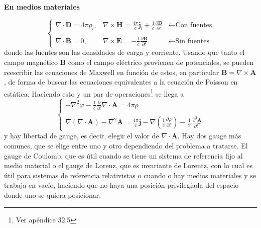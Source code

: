 \begin{center}
\textbf{En medios materiales}
\end{center}
\begin{equation*}
    \left\{
        \begin{matrix}
            \nabla \cdot \textbf{D} = 4\pi\rho_{l},
            &
            \nabla \times \textbf{H} = 
            \frac{4\pi}{c}\textbf{j}_{l}
            + \frac{1}{c}\frac{\partial \textbf{D}}{\partial t}
            &
            \longleftarrow
            \mbox{Con fuentes}\\
            & & \\
            \nabla \cdot \textbf{B} = 0,
            &
            \nabla \times \textbf{E} =
            -\frac{1}{c}\frac{\partial \textbf{B}}{\partial t}
            &
            \longleftarrow \mbox{Sin fuentes}
        \end{matrix}
    \right.
\end{equation*}
donde las fuentes son las densidades de carga y corriente. Usando que tanto el campo magnético $\textbf{B}$ como el campo eléctrico provienen de potenciales, se pueden reescribir las ecuaciones de Maxwell en función de estos, en particular $\textbf{B} = \nabla \times \textbf{A}$, de forma de buscar las ecuaciones equivalentes a la ecuación de Poisson en estática. Haciendo esto y un par de operaciones\footnote{Ver apéndice 32.5 } se llega a
\begin{equation*}
    \left\{
        \begin{matrix}
            -\nabla^{2}\varphi - \frac{1}{c}\frac{\partial}{\partial t}
            \nabla \cdot \textbf{A}
            = 4\pi\rho\\
            \\
            \nabla (\nabla \cdot \textbf{A})
            - \nabla^{2}\textbf{A} = \frac{4\pi}{c}\textbf{j}
            - \nabla 
            \left(
                \frac{1}{c}\frac{\partial \varphi}{\partial t}
            \right)
            -\frac{1}{c^{2}}\frac{\partial^{2}\textbf{A}}{\partial t^{2}}
        \end{matrix}
    \right.
        \label{ec:MaxwellyPotencialesenTiempo}
\end{equation*}
y hay libertad de gauge, es decir, elegir el valor de $\nabla \cdot \textbf{A}$. Hay dos gauge más comunes, que se elige entre uno y otro dependiendo del problema a tratarse. El gauge de Coulomb, que es útil cuando se tiene un sistema de referencia fijo al medio material o el gauge de Lorenz, que es invariante de Lorentz, con lo cual es útil para sistemas de referencia relativistas o cuando o hay medios materiales y se trabaja en vacío, haciendo que no haya una posición privilegiada del espacio donde uno se quiera posicionar.
